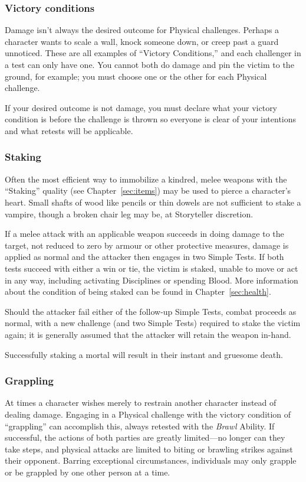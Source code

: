 \subsubsection{Victory conditions}
Damage isn't always the desired outcome for Physical challenges.  Perhaps a character wants to 
scale a wall, knock someone down, or creep past a guard unnoticed.  These are all examples of 
``Victory Conditions,'' and each challenger in a test can only have one.  You cannot both do 
damage and pin the victim to the ground, for example; you must choose one or the other for each 
Physical challenge.

If your desired outcome is not damage, you must declare what your victory condition is before the 
challenge is thrown so everyone is clear of your intentions and what retests will be applicable.

\subsubsection{Staking}
Often the most efficient way to immobilize a kindred, melee weapons with the ``Staking'' quality 
(see Chapter~\ref{sec:items}) may be used to pierce a character's heart.  Small shafts of wood like 
pencils or thin dowels are not sufficient to stake a vampire, though a broken chair leg may be, at 
Storyteller discretion.

If a melee attack with an applicable weapon succeeds in doing damage to the target, not reduced to 
zero by armour or other protective measures, damage is applied as normal and the attacker then engages 
in two Simple Tests.  If both tests succeed with either a win or tie, the victim is staked, unable to 
move or act in any way, including activating Disciplines or spending Blood.  More information about 
the condition of being staked can be found in Chapter~\ref{sec:health}.

Should the attacker fail either of the follow-up Simple Tests, combat proceeds as normal, with a 
new challenge (and two Simple Tests) required to stake the victim again; it is generally assumed that 
the attacker will retain the weapon in-hand.

Successfully staking a mortal will result in their instant and gruesome death.

\subsubsection{Grappling}
At times a character wishes merely to restrain another character instead of dealing damage.  Engaging 
in a Physical challenge with the victory condition of ``grappling'' can accomplish this, always retested 
with the \emph{Brawl} Ability.  If successful, the actions of both parties are greatly limited---no longer 
can they take steps, and physical attacks are limited to biting or brawling strikes against their opponent.  
Barring exceptional circumstances, individuals may only grapple or be grappled by one other person at a time.  

